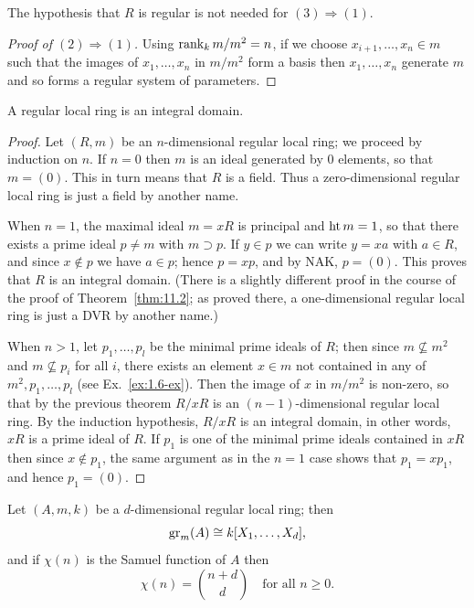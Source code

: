 \begin{remark}
The hypothesis that $R$ is regular is not needed for $(3) \Rightarrow (1)$.
\end{remark}

\begin{proof}[Proof of $(2) \Rightarrow (1)$]
Using $\operatorname{rank}_k m/m^2 = n$, if we choose $x_{i+1}, \ldots, x_n \in m$ such that
the images of $x_1, \ldots, x_n$ in $m/m^2$ form a basis then $x_1, \ldots, x_n$ generate $m$
and so forms a regular system of parameters.
\end{proof}

\begin{theorem}\label{thm:14.3}
A regular local ring is an integral domain.
\end{theorem}

\begin{proof}
Let $(R, m)$ be an $n$-dimensional regular local ring; we proceed by
induction on $n$. If $n = 0$ then $m$ is an ideal generated by $0$ elements, so
that $m = (0)$. This in turn means that $R$ is a field. Thus a zero-dimensional
regular local ring is just a field by another name.

When $n = 1$, the maximal ideal $m = xR$ is principal and $\operatorname{ht} m = 1$, so that
there exists a prime ideal $p \neq m$ with $m \supset p$. If $y \in p$ we can write $y = xa$ with
$a \in R$, and since $x \notin p$ we have $a \in p$; hence $p = xp$, and by NAK, $p = (0)$. This
proves that $R$ is an integral domain. (There is a slightly different proof in the
course of the proof of Theorem~\ref{thm:11.2}; as proved there, a one-dimensional
regular local ring is just a DVR by another name.)

When $n > 1$, let $p_1, \ldots, p_l$ be the minimal prime ideals of $R$; then since
$m \nsubseteq m^2$ and $m \nsubseteq p_i$ for all $i$, there exists an element $x \in m$ not contained
in any of $m^2, p_1, \ldots, p_l$ (see Ex.~\ref{ex:1.6-ex}). Then the image of $x$ in $m/m^2$ is non-zero,
so that by the previous theorem $R/xR$ is an $(n - 1)$-dimensional regular
local ring. By the induction hypothesis, $R/xR$ is an integral domain, in
other words, $xR$ is a prime ideal of $R$. If $p_1$ is one of the minimal prime ideals
contained in $xR$ then since $x \notin p_1$, the same argument as in the $n = 1$ case
shows that $p_1 = xp_1$, and hence $p_1 = (0)$.
\end{proof}

\begin{theorem}\label{thm:14.4}
Let $(A, m, k)$ be a $d$-dimensional regular local ring; then
\[
  \operatorname{gr}_m(A) \cong k[X_1, \ldots, X_d],
\]
and if $\chi(n)$ is the Samuel function of $A$ then
\[
  \chi(n) = \binom{n+d}{d} \quad \text{for all } n \ge 0.
\]
\end{theorem}

